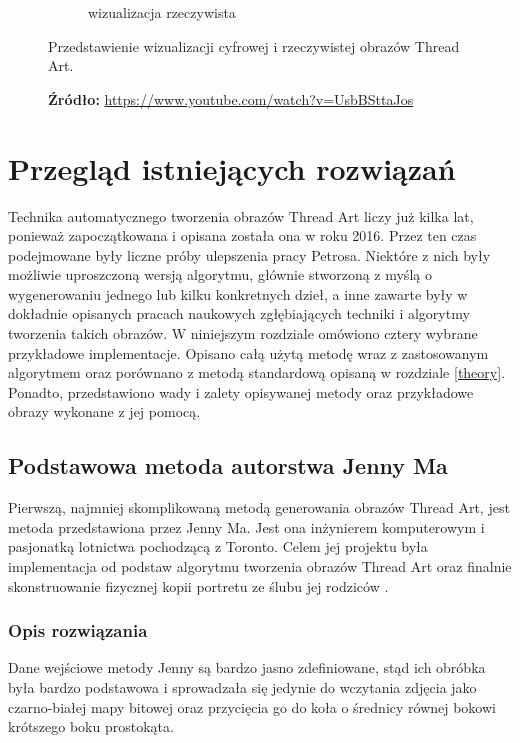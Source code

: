 \begin{figure}[htb]
\begin{subfigure}{0.49\textwidth}
            \caption{wizualizacja rzeczywista}
            \label{theory-technics-vis-comp-b}
        \end{subfigure}
        \caption{Przedstawienie wizualizacji cyfrowej i rzeczywistej obrazów Thread Art.}
        \caption*{\footnotesize{\textbf{Źródło:}
        \url{https://www.youtube.com/watch?v=UsbBSttaJos}}}
        \label{theory-technics-vis-comp}
        \end{figure}
            
\chapter{Przegląd istniejących rozwiązań} \label{others}
Technika automatycznego tworzenia obrazów Thread Art liczy już kilka lat, ponieważ zapoczątkowana i opisana została ona w roku 2016. Przez ten czas podejmowane były liczne próby ulepszenia pracy Petrosa. Niektóre z nich były możliwie uproszczoną wersją algorytmu, głównie stworzoną z myślą o wygenerowaniu jednego lub kilku konkretnych dzieł, a inne zawarte były w dokładnie opisanych pracach naukowych zgłębiających techniki i algorytmy tworzenia takich obrazów. W niniejszym rozdziale omówiono cztery wybrane przykładowe implementacje. Opisano całą użytą metodę wraz z zastosowanym algorytmem oraz porównano z metodą standardową opisaną w rozdziale \ref{theory}. Ponadto, przedstawiono wady i zalety opisywanej metody oraz przykładowe obrazy wykonane z jej pomocą.
    \section{Podstawowa metoda autorstwa Jenny Ma} \label{others-jenny}
    Pierwszą, najmniej skomplikowaną metodą generowania obrazów Thread Art, jest metoda przedstawiona przez Jenny Ma. Jest ona inżynierem komputerowym i pasjonatką lotnictwa pochodzącą z Toronto. Celem jej projektu była implementacja od podstaw algorytmu tworzenia obrazów Thread Art oraz finalnie skonstruowanie fizycznej kopii portretu ze ślubu jej rodziców \cite{jenny-youtube}.
        \subsection{Opis rozwiązania}
        Dane wejściowe metody Jenny są bardzo jasno zdefiniowane, stąd ich obróbka była bardzo podstawowa i sprowadzała się jedynie do wczytania zdjęcia jako czarno-białej mapy bitowej oraz przycięcia go do koła o średnicy równej bokowi krótszego boku prostokąta. 
        

